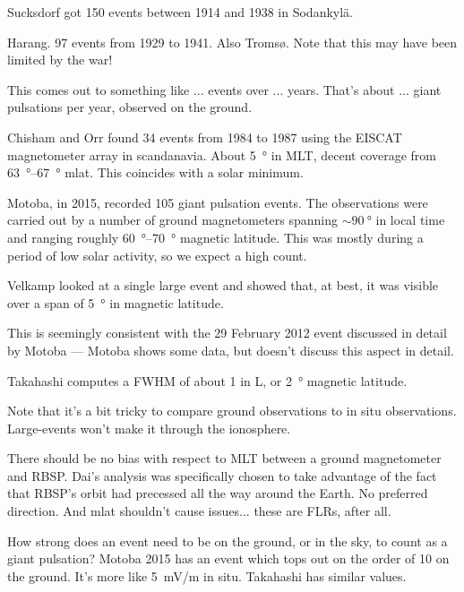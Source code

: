 Sucksdorf\cite{sucksdorff_1939} got 150 events between 1914 and 1938 in Sodankyl{\"a}. 

Harang\cite{harang_1941}. 97 events from 1929 to 1941. Also Troms{\o}. Note that this may have been limited by the war! 

This comes out to something like ... events over ... years. That's about ... giant pulsations per year, observed on the ground. 


Chisham and Orr\cite{chisham_1991} found 34 events from 1984 to 1987 using the EISCAT magnetometer array in scandanavia. About \SI{5}{\degree} in MLT, decent coverage from \SIrange{63}{67}{\degree} mlat. This coincides with a solar minimum. 

Motoba, in 2015, recorded 105 giant pulsation events. The observations were carried out by a number of ground magnetometers spanning $\sim \SI{90}{\degree}$ in local time and ranging roughly \SIrange{60}{70}{\degree} magnetic latitude\cite{motoba_2015}. This was mostly during a period of low solar activity, so we expect a high count. 


Velkamp\cite{veldkamp_1960} looked at a single large event and showed that, at best, it was visible over a span of \SI{5}{\degree} in magnetic latitude. 

This is seemingly consistent with the 29 February 2012 event discussed in detail by Motoba\cite{motoba_2015} --- Motoba shows some data, but doesn't discuss this aspect in detail. 

Takahashi\cite{takahashi_2011} computes a FWHM of about 1 in L, or \SI{2}{\degree} magnetic latitude. 


Note that it's a bit tricky to compare ground observations to in situ observations. Large-\azm events won't make it through the ionosphere. 

There should be no bias with respect to MLT between a ground magnetometer and RBSP. Dai's analysis was specifically chosen to take advantage of the fact that RBSP's orbit had precessed all the way around the Earth. No preferred direction. And mlat shouldn't cause issues... these are FLRs, after all. 

How strong does an event need to be on the ground, or in the sky, to count as a giant pulsation? Motoba 2015\cite{motoba_2015} has an event which tops out on the order of \SI{10}{\nT} on the ground. It's more like \SI{5}{\mV/\m} in situ. Takahashi\cite{takahashi_2011} has similar values. 

